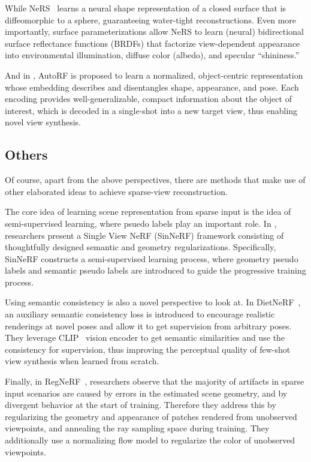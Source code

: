 \documentclass[10pt,twocolumn,letterpaper]{article}
\begin{document}
While NeRS~\cite{zhang2021ners} learns a neural shape representation of a closed surface that is diffeomorphic to a sphere, guaranteeing water-tight reconstructions. Even more importantly, surface parameterizations allow NeRS to learn (neural) bidirectional surface reflectance functions (BRDFs) that factorize view-dependent appearance into environmental illumination, diffuse color (albedo), and specular “shininess.”

And in \cite{mueller2022autorf}, AutoRF is proposed to learn a normalized, object-centric representation whose embedding describes and disentangles shape, appearance, and pose. Each encoding provides well-generalizable, compact information about the object of interest, which is decoded in a single-shot into a new target view, thus enabling novel view synthesis.

\subsection{Others}

Of course, apart from the above perspectives, there are methods that make use of other elaborated ideas to achieve sparse-view reconstruction.

The core idea of learning scene representation from sparse input is the idea of semi-supervised learning, where psuedo labels play an important role. 
In \cite{Xu_2022_SinNeRF}, researchers present a Single View NeRF (SinNeRF) framework consisting of thoughtfully designed semantic and geometry regularizations.
Specifically, SinNeRF constructs a semi-supervised learning process, where geometry pseudo labels and semantic pseudo labels are introduced to guide the progressive training process.

Using semantic consistency is also a novel perspective to look at. In DietNeRF~\cite{Jain_2021_ICCV}, an auxiliary semantic consistency loss is introduced to encourage realistic renderings at novel poses and allow it to get supervision from arbitrary poses. They leverage CLIP~\cite{DBLP:journals/corr/abs-2103-00020} vision encoder to get semantic similarities and use the consistency for supervision, thus improving the perceptual quality of few-shot view synthesis when learned from scratch.

Finally, in RegNeRF~\cite{Niemeyer2021Regnerf}, researchers observe that the majority of artifacts in sparse input scenarios are caused by errors in the estimated scene geometry, and by divergent behavior at the start of training. Therefore they address this by regularizing the geometry and appearance of patches rendered from unobserved viewpoints, and annealing the ray sampling space during training. They additionally use a normalizing flow model to regularize the color of unobserved viewpoints.
\end{document}

